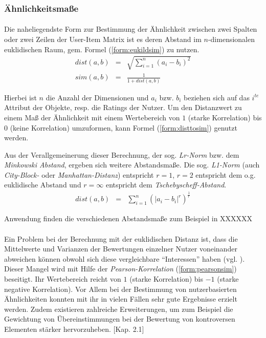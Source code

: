 \subsubsection{Ähnlichkeitsmaße}

\paragraph{} Die naheliegendste Form zur Bestimmung der Ähnlichkeit zwischen zwei Spalten oder zwei Zeilen der User-Item Matrix ist es deren Abstand im $n$-dimensionalen euklidischen Raum, gem. Formel (\ref{form:eukildsim}) zu nutzen.
\begin{align}
\label{form:eukildsim}
dist(a,b) & = & \sqrt{\sum_{i=1}^{n} (a_i - b_i)^2} \\
sim(a,b) & = & \frac{1}{1+dist(a,b)} \label{form:disttosim}
\end{align}

Hierbei ist $n$ die Anzahl der Dimensionen und $a_i$ bzw. $b_i$ beziehen sich auf das  $i^{te}$ Attribut der Objekte, resp. die Ratings der Nutzer. Um den Distanzwert zu einem Maß der Ähnlichkeit mit einem Wertebereich von $1$ (starke Korrelation) bis $0$ (keine Korrelation) umzuformen, kann Formel (\ref{form:disttosim}) genutzt werden.

Aus der Verallgemeinerung dieser Berechnung, der sog. \textit{Lr-Norm} bzw. dem \textit{Minkowski Abstand}, ergeben sich weitere Abstandsmaße. Die sog. \textit{L1-Norm} (auch \textit{City-Block-} oder \textit{Manhattan-Distanz}) entspricht $r=1$, $r=2$ entspricht dem o.g. euklidische Abstand und $ r=\infty $ entspricht dem \textit{Tschebyscheff-Abstand}. \citep{hb_02}
\begin{align}
\label{form:minkowskisim}
dist(a,b) & = & \sum_{i=1}^{n} (\left| a_i - b_i \right|^r)^\frac{1}{r}
\end{align}

Anwendung finden die verschiedenen Abstandsmaße zum Beispiel in XXXXXX 

\paragraph{} Ein Problem bei der Berechnung mit der euklidischen Distanz ist, dass die Mittelwerte und Varianzen der Bewertungen einzelner Nutzer voneinander abweichen können obwohl sich diese vergleichbare ``Interessen'' haben (vgl. \citep[Kap. 2]{pci}). Dieser Mangel wird mit Hilfe der \textit{Pearson-Korrelation} (\ref{form:pearsonsim}) beseitigt.  Ihr Wertebereich reicht von $1$ (starke Korrelation) bis $-1$ (starke negative Korrelation). Vor Allem bei der Bestimmung von nutzerbasierten Ähnlichkeiten konnten mit ihr in vielen Fällen sehr gute Ergebnisse erzielt werden. Zudem existieren zahlreiche Erweiterungen, um zum Beispiel die Gewichtung von Übereinstimmungen bei der Bewertung von kontroversen Elementen stärker hervorzuheben. \citep{rs}[Kap. 2.1] \citep{hb_02}


